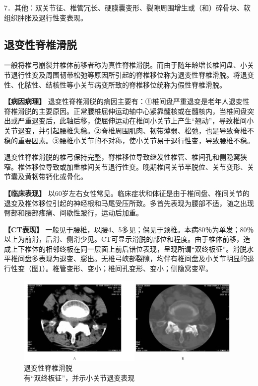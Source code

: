 7．其他：双关节征、椎管冗长、硬膜囊变形、裂隙周围增生或（和）碎骨块、软组织肿胀及退行性变表现。

\subsection{退变性脊椎滑脱}

一般将椎弓崩裂并椎体前移者称为真性脊椎滑脱。而由于随年龄增长椎间盘、小关节退行性变及周围韧带松弛等原因所引起的脊椎移位称为退变性脊椎滑脱。将退变性、化脓性、结核性等小关节病变所致的脊椎移位统称为假性脊椎滑脱。

\textbf{【病因病理】}
退变性脊椎滑脱的病因主要有：①椎间盘严重退变是老年人退变性脊椎滑脱的主要原因。正常腰椎屈伸运动轴中心紧靠髓核或在髓核内，当椎间盘突出或严重退变后，此轴后移，使屈伸运动在椎间小关节上产生“翘动”，导致椎间小关节退变，并引起腰椎失稳。②脊椎周围肌肉、韧带薄弱、松弛，也是导致脊椎不稳的重要因素。③腰椎小关节的不对称，使小关节易于退行性变，导致腰椎不稳。

退变性脊椎滑脱的椎弓保持完整，脊椎移位导致继发性椎管、椎间孔和侧隐窝狭窄。椎体移位导致或加重椎间关节退行性变。晚期椎间关节半脱位、关节变形、关节囊及黄韧带钙化或骨化。

\textbf{【临床表现】}
以60岁左右女性常见。临床症状和体征是由于椎间盘、椎间关节的退变及椎体移位引起的神经根和马尾受压所致。多首先表现为腰部不适，随之出现臀部和腰部疼痛、间歇性跛行，运动后加重。

\textbf{【CT表现】}
一般见于腰椎，以腰4、5多见；偶见于颈椎。本病80％为单发；80％以上为前滑，后滑、侧滑少见。CT可显示滑脱的部位和程度。由于椎体前移，造成上下椎体的相邻终板在同一层面上前后错位表现，呈现所谓“双终板征”。滑脱水平椎间盘多表现为退变、膨出。无椎弓峡部裂隙，均伴有椎间盘及小关节明显的退行性变（图\ref{fig23-12}）。椎管变形、变小；椎间孔变形、变小；侧隐窝变窄。

\begin{figure}[!htbp]
 \centering
 \includegraphics[width=.7\textwidth,height=\textheight,keepaspectratio]{./images/Image00475.jpg}
 \captionsetup{justification=centering}
 \caption{退变性脊椎滑脱\\{\small 有“双终板征”，并示小关节退变表现}}
 \label{fig23-12}
  \end{figure} 

